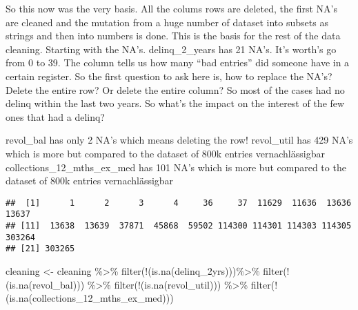 \documentclass[
]{article}
\newenvironment{Shaded}{\begin{snugshade}}{\end{snugshade}}
\newcommand{\ConstantTok}[1]{\textcolor[rgb]{0.00,0.00,0.00}{#1}}
\newcommand{\FunctionTok}[1]{\textcolor[rgb]{0.00,0.00,0.00}{#1}}
\newcommand{\NormalTok}[1]{#1}
\newcommand{\OtherTok}[1]{\textcolor[rgb]{0.56,0.35,0.01}{#1}}
\newcommand{\SpecialCharTok}[1]{\textcolor[rgb]{0.00,0.00,0.00}{#1}}
\begin{document}
So this now was the very basis. All the colums rows are deleted, the
first NA's are cleaned and the mutation from a huge number of dataset
into subsets as strings and then into numbers is done. This is the basis
for the rest of the data cleaning. Starting with the NA's.
delinq\_2\_years has 21 NA's. It's worth's go from 0 to 39. The column
tells us how many ``bad entries'' did someone have in a certain
register. So the first question to ask here is, how to replace the NA's?
Delete the entire row? Or delete the entire column? So most of the cases
had no delinq within the last two years. So what's the impact on the
interest of the few ones that had a delinq?

revol\_bal has only 2 NA's which means deleting the row! revol\_util has
429 NA's which is more but compared to the dataset of 800k entries
vernachlässigbar collections\_12\_mths\_ex\_med has 101 NA's which is
more but compared to the dataset of 800k entries vernachlässigbar

\begin{Shaded}
\end{Shaded}

\begin{verbatim}
##  [1]      1      2      3      4     36     37  11629  11636  13636  13637
## [11]  13638  13639  37871  45868  59502 114300 114301 114303 114305 303264
## [21] 303265
\end{verbatim}

\begin{Shaded}
\begin{Highlighting}[]
\NormalTok{cleaning }\OtherTok{\textless{}{-}}\NormalTok{ cleaning }\SpecialCharTok{\%\textgreater{}\%} \FunctionTok{filter}\NormalTok{(}\SpecialCharTok{!}\NormalTok{(}\FunctionTok{is.na}\NormalTok{(delinq\_2yrs)))}\SpecialCharTok{\%\textgreater{}\%} \FunctionTok{filter}\NormalTok{(}\SpecialCharTok{!}\NormalTok{(}\FunctionTok{is.na}\NormalTok{(revol\_bal))) }\SpecialCharTok{\%\textgreater{}\%} \FunctionTok{filter}\NormalTok{(}\SpecialCharTok{!}\NormalTok{(}\FunctionTok{is.na}\NormalTok{(revol\_util))) }\SpecialCharTok{\%\textgreater{}\%} \FunctionTok{filter}\NormalTok{(}\SpecialCharTok{!}\NormalTok{(}\FunctionTok{is.na}\NormalTok{(collections\_12\_mths\_ex\_med)))}
\end{Highlighting}
\end{Shaded}
\end{document}
